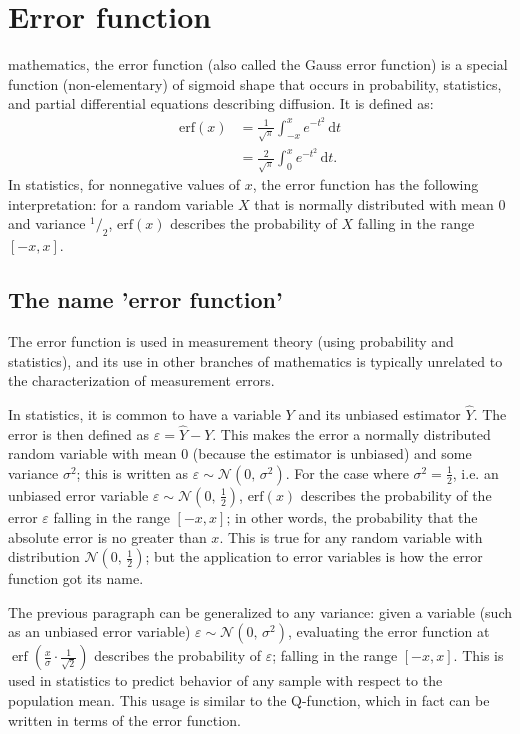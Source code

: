 \documentclass{article}
\begin{document}
	\section{Error function}
	mathematics, the error function (also called the Gauss error function) is a special function (non-elementary) of sigmoid shape that occurs in probability, statistics, and partial differential equations describing diffusion. It is defined as:
	\begin{align}
		\mathrm{erf}(x) & = \frac{1}{\sqrt\pi}\int_{-x}^x e^{-t^2} \,\mathrm dt \\
		& = \frac{2}{\sqrt\pi}\int_0^x e^{-t^2}\,\mathrm dt.
	\end{align}
	In statistics, for nonnegative values of $x$, the error function has the following interpretation: for a random variable $X$ that is normally distributed with mean 0 and variance ${}^1\!/_2$, $\mathrm{erf}(x)$ describes the probability of $X$ falling in the range $[-x,x]$.

	\subsection{The name 'error function'}
	The error function is used in measurement theory (using probability and statistics), and its use in other branches of mathematics is typically unrelated to the characterization of measurement errors.

	In statistics, it is common to have a variable $Y$ and its unbiased estimator $\hat{Y}$. The error is then defined as $\varepsilon = \hat{Y} - Y$. This makes the error a normally distributed random variable with mean 0 (because the estimator is unbiased) and some variance $\sigma^2$; this is written as $\varepsilon \sim \mathcal{N}(0,\,\sigma^2)$. For the case where $\sigma^2 = \frac{1}{2}$, i.e. an unbiased error variable $\varepsilon \sim \mathcal{N}(0,\,\frac{1}{2})$, $\mathrm{erf}(x)$ describes the probability of the error $\varepsilon$ falling in the range $[-x,x]$; in other words, the probability that the absolute error is no greater than $x$. This is true for any random variable with distribution $\mathcal{N}(0,\,\frac{1}{2})$; but the application to error variables is how the error function got its name.
	
	The previous paragraph can be generalized to any variance: given a variable (such as an unbiased error variable) $\varepsilon \sim \mathcal{N}(0,\,\sigma^2)$, evaluating the error function at $\operatorname{erf}\left( \frac{x}{\sigma} \cdot \frac{1}{\sqrt{2}} \right)$ describes the probability of $\varepsilon$; falling in the range $[-x, x]$. This is used in statistics to predict behavior of any sample with respect to the population mean. This usage is similar to the Q-function, which in fact can be written in terms of the error function.
	
\end{document}
